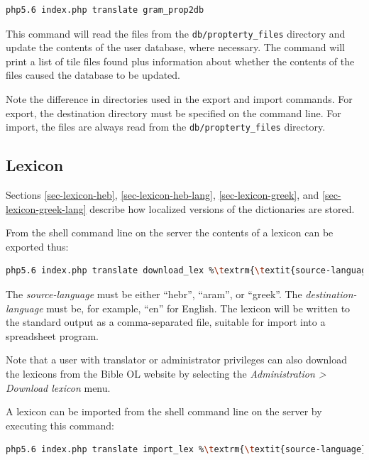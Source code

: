 \documentclass[11pt,oneside,a4paper]{memoir}
\begin{document}
\begin{lstlisting}[language=bash,basicstyle={\ttfamily}]
php5.6 index.php translate gram_prop2db
\end{lstlisting}

This command will read the files from the \texttt{db/propterty\_files} directory and update the contents of
the user database, where necessary. The command will print a list of tile files found plus
information about whether the contents of the files caused the database to be updated.

Note the difference in directories used in the export and import commands. For export, the
destination directory must be specified on the command line. For import, the files are always read
from the \texttt{db/propterty\_files} directory.

\subsection{Lexicon}

Sections \ref{sec-lexicon-heb}, \ref{sec-lexicon-heb-lang}, \ref{sec-lexicon-greek}, and
\ref{sec-lexicon-greek-lang} describe how localized versions of the dictionaries are stored.

From the shell command line on the server the contents of a lexicon can be exported thus:

\begin{lstlisting}[language=bash,basicstyle={\ttfamily}]
php5.6 index.php translate download_lex %\textrm{\textit{source-language}}% %\textrm{\textit{target-language}}%
\end{lstlisting}

The \emph{source-language} must be either ``hebr'', ``aram'', or ``greek''. The
\emph{destination-language} must be, for example, ``en'' for English. The lexicon will be written to
the standard output as a comma-separated file, suitable for import into a spreadsheet program.

Note that a user with translator or administrator privileges can also download the lexicons from the
Bible OL website by selecting the \emph{Administration > Download lexicon} menu.

A lexicon can be imported from the shell command line on the server by executing this command:

\begin{lstlisting}[language=bash,basicstyle={\ttfamily}]
php5.6 index.php translate import_lex %\textrm{\textit{source-language}}% %\textrm{\textit{target-language}}%  %\textrm{\textit{CSV-file}}%
\end{lstlisting}
\end{document}

